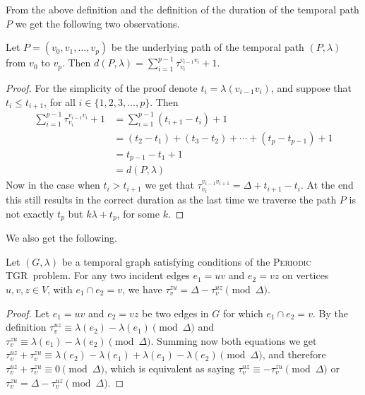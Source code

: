 \documentclass[a4paper,UKenglish,cleveref, autoref, thm-restate, anonymous]{lipics-v2021}
\newcommand{\deltaExact}{\textsc{Periodic TGR}}
\begin{document}
    From the above definition and the definition of the duration of the temporal path $P$ we get the following two observations.
    \begin{observation}\label{obs:durationPwithWaitingTimes}
        Let $P = (v_0, v_1, \dots, v_p)$ be the underlying path of the temporal path
        $(P, \lambda)$ from $v_0$ to $v_p$.
        Then $d(P,\lambda) = \sum_{i = 1}^{p-1} \tau_{v_i}^{v_{i-1}v_i} + 1 $.
    \end{observation}
    \begin{proof}
        For the simplicity of the proof denote $t_i = \lambda(v_{i-1}v_i)$, and suppose that $t_i \leq t_{i+1}$, for all $i \in \{1,2,3,\dots,p\}$.
        Then
        \begin{align*}
        \sum_{i = 1}^{p-1} \tau_{v_i}^{v_{i-1}v_i} + 1  
        &= \sum _{i = 1}^{p-1} (t_{i+1} - t_i) + 1 \\
        & = (t_2 - t_1) + (t_3 - t_2) + \cdots + (t_p - t_{p-1}) + 1  \\
        & = t_{p-1} - t_1 + 1\\
        & = d(P, \lambda)
        \end{align*}
        Now in the case when $t_i > t_{i+1}$ we get that $\tau_{v_i}^{v_{i-1}v_{i+1}} = \Delta + t_{i+1} - t_i$.
        At the end this still results in the correct duration as the last time we traverse the path $P$ is not exactly $t_p$ but $k \lambda + t_p$, for some $k$.
    \end{proof}
    We also get the following.
    \begin{observation}\label{obs:travel-delays-both-directions}
    Let $(G, \lambda)$ be a temporal graph satisfying conditions of the \deltaExact\ problem.
    For any two incident edges $e_1 = uv$ and $e_2 = vz$ on vertices $u,v,z \in V$, with $e_1 \cap e_2 = v$, we have $\tau_v^{zu} = \Delta - \tau_v^{uz} \pmod \Delta$.
    \end{observation}
    
    \begin{proof}
        Let $e_1 = uv$ and $e_2 = vz$ be two edges in $G$ for which $e_1 \cap e_2 = v$. 
        By the definition $\tau_v^{uz} \equiv \lambda (e_2) - \lambda(e_1) \pmod \Delta$ and $\tau_v^{zu} \equiv \lambda (e_1) - \lambda(e_2) \pmod \Delta$.
        Summing now both equations we get $\tau_v^{uz} + \tau_v^{zu} \equiv \lambda(e_2) - \lambda(e_1) + \lambda (e_1) - \lambda(e_2) \pmod \Delta$, and therefore $\tau_v^{uz} + \tau_v^{zu} \equiv 0 \pmod \Delta$, which is equivalent as saying $\tau_v^{uz} \equiv - \tau_v^{zu} \pmod \Delta$ or $\tau_v^{zu} = \Delta - \tau_v^{uz} \pmod \Delta$.
    \end{proof}
\end{document}
